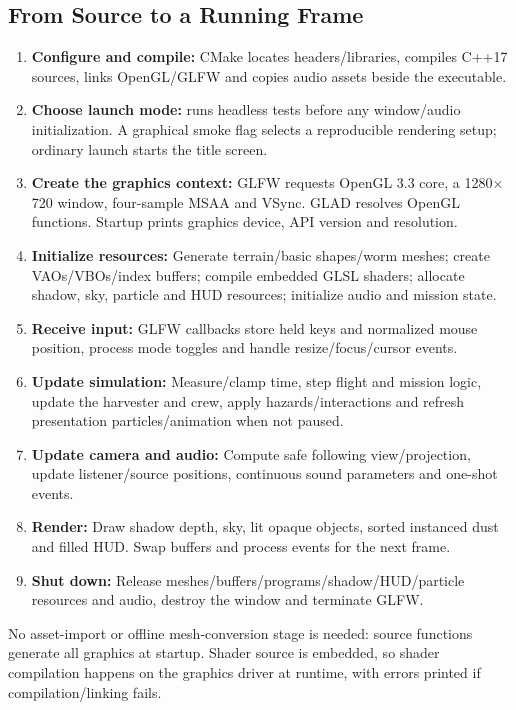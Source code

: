 \subsection{From Source to a Running Frame}
\begin{enumerate}
\item \textbf{Configure and compile:} CMake locates headers/libraries, compiles C++17 sources, links OpenGL/GLFW and copies audio assets beside the executable.
\item \textbf{Choose launch mode:}  runs headless tests before any window/audio initialization. A graphical smoke flag selects a reproducible rendering setup; ordinary launch starts the title screen.
\item \textbf{Create the graphics context:} GLFW requests OpenGL 3.3 core, a 1280$\times$720 window, four-sample MSAA and VSync. GLAD resolves OpenGL functions. Startup prints graphics device, API version and resolution.
\item \textbf{Initialize resources:} Generate terrain/basic shapes/worm meshes; create VAOs/VBOs/index buffers; compile embedded GLSL shaders; allocate shadow, sky, particle and HUD resources; initialize audio and mission state.
\item \textbf{Receive input:} GLFW callbacks store held keys and normalized mouse position, process mode toggles and handle resize/focus/cursor events.
\item \textbf{Update simulation:} Measure/clamp time, step flight and mission logic, update the harvester and crew, apply hazards/interactions and refresh presentation particles/animation when not paused.
\item \textbf{Update camera and audio:} Compute safe following view/projection, update listener/source positions, continuous sound parameters and one-shot events.
\item \textbf{Render:} Draw shadow depth, sky, lit opaque objects, sorted instanced dust and filled HUD. Swap buffers and process events for the next frame.
\item \textbf{Shut down:} Release meshes/buffers/programs/shadow/HUD/particle resources and audio, destroy the window and terminate GLFW.
\end{enumerate}
No asset-import or offline mesh-conversion stage is needed: source functions generate all graphics at startup. Shader source is embedded, so shader compilation happens on the graphics driver at runtime, with errors printed if compilation/linking fails.

